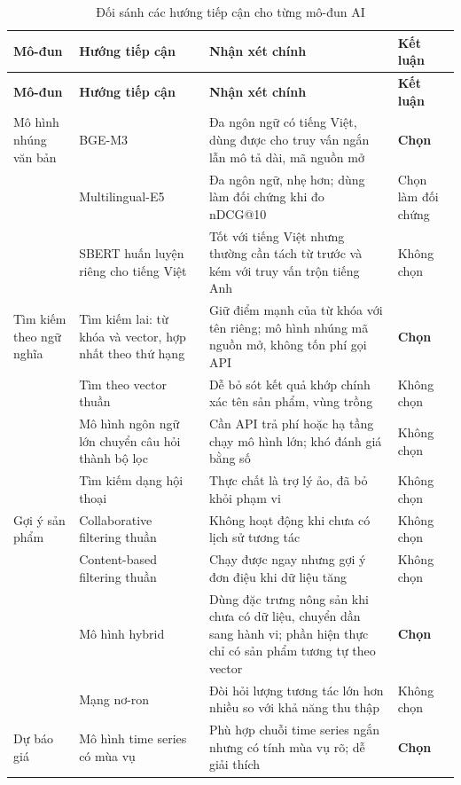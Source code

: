 \begingroup
\tblsetup\tblzebra
\begin{longtable}{L{2.60cm} L{3.74cm} L{4.67cm} L{3.53cm}}
\caption{Đối sánh các hướng tiếp cận cho từng mô-đun AI}
\label{tab:sosanh-ai} \\
\toprule
{}
\textbf{Mô-đun} & \textbf{Hướng tiếp cận} & \textbf{Nhận xét chính} & \textbf{Kết luận} \\
\midrule
\endfirsthead
\toprule
{}
\textbf{Mô-đun} & \textbf{Hướng tiếp cận} & \textbf{Nhận xét chính} & \textbf{Kết luận} \\
\midrule
\endhead
\bottomrule
\endfoot
Mô hình nhúng văn bản & BGE-M3 & Đa ngôn ngữ có tiếng Việt, dùng được cho truy vấn ngắn lẫn mô tả dài, mã nguồn mở & \textbf{Chọn} \\
& Multilingual-E5 & Đa ngôn ngữ, nhẹ hơn; dùng làm đối chứng khi đo nDCG@10 & Chọn làm đối chứng \\
& SBERT huấn luyện riêng cho tiếng Việt & Tốt với tiếng Việt nhưng thường cần tách từ trước và kém với truy vấn trộn tiếng Anh & Không chọn \\
Tìm kiếm theo ngữ nghĩa & Tìm kiếm lai: từ khóa và vector, hợp nhất theo thứ hạng & Giữ điểm mạnh của từ khóa với tên riêng; mô hình nhúng mã nguồn mở, không tốn phí gọi API & \textbf{Chọn} \\
& Tìm theo vector thuần & Dễ bỏ sót kết quả khớp chính xác tên sản phẩm, vùng trồng & Không chọn \\
& Mô hình ngôn ngữ lớn chuyển câu hỏi thành bộ lọc & Cần API trả phí hoặc hạ tầng chạy mô hình lớn; khó đánh giá bằng số & Không chọn \\
& Tìm kiếm dạng hội thoại & Thực chất là trợ lý ảo, đã bỏ khỏi phạm vi & Không chọn \\
Gợi ý sản phẩm & Collaborative filtering thuần & Không hoạt động khi chưa có lịch sử tương tác & Không chọn \\
& Content-based filtering thuần & Chạy được ngay nhưng gợi ý đơn điệu khi dữ liệu tăng & Không chọn \\
& Mô hình hybrid & Dùng đặc trưng nông sản khi chưa có dữ liệu, chuyển dần sang hành vi; phần hiện thực chỉ có sản phẩm tương tự theo vector & \textbf{Chọn} \\
& Mạng nơ-ron & Đòi hỏi lượng tương tác lớn hơn nhiều so với khả năng thu thập & Không chọn \\
Dự báo giá & Mô hình time series có mùa vụ & Phù hợp chuỗi time series ngắn nhưng có tính mùa vụ rõ; dễ giải thích & \textbf{Chọn} \\

\end{longtable}
